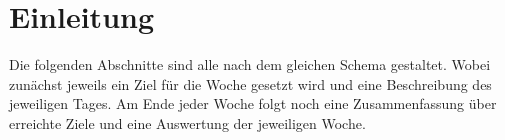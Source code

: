 \documentclass[12pt,a4paper,bibliography=totocnumbered,listof=totocnumbered]{scrartcl}
\begin{document}
\singlespacing
{}
\renewcommand{\contentsname}{II Inhaltsverzeichnis}
{}
\addtocounter{section}{1}
\tableofcontents
\pagebreak
{}
\listoffigures
\pagebreak

\renewcommand{\lstlistlistingname}{Listing-Verzeichnis}
{\lstlistoflistings}
\pagebreak



\renewcommand{\sectionmark}[1]{\markright{#1}}
\renewcommand{\subsectionmark}[1]{}
\renewcommand{\subsubsectionmark}[1]{}
\rhead{\rightmark}

\onehalfspacing
\renewcommand{\thesection}{\arabic{section}}
\renewcommand{\theHsection}{\arabic{section}}
\setcounter{section}{0}
\setcounter{page}{1}

\section{Einleitung}
Die folgenden Abschnitte sind alle nach dem gleichen Schema gestaltet. Wobei zunächst jeweils ein Ziel für die Woche gesetzt wird und eine Beschreibung des jeweiligen Tages. Am Ende jeder Woche folgt noch eine Zusammenfassung über erreichte Ziele und eine Auswertung der jeweiligen Woche. 
\end{document}
